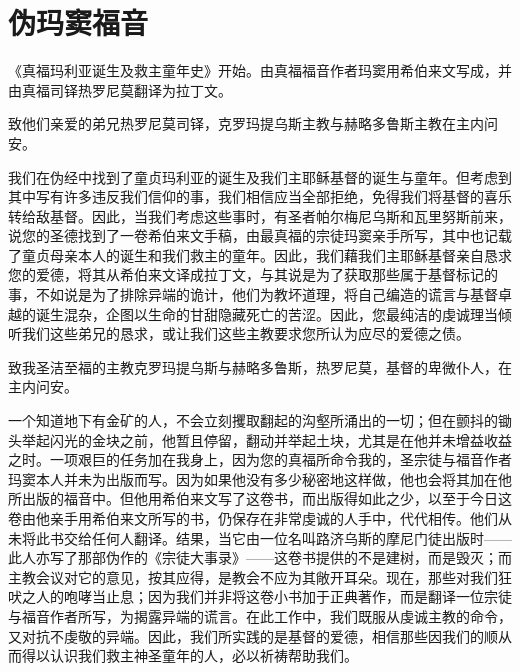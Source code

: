 
\chapter{伪玛窦福音}


《真福玛利亚诞生及救主童年史》开始。由真福福音作者玛窦用希伯来文写成，并由真福司铎热罗尼莫翻译为拉丁文。\par

致他们亲爱的弟兄热罗尼莫司铎，克罗玛提乌斯主教与赫略多鲁斯主教在主内问安。\par

我们在伪经中找到了童贞玛利亚的诞生及我们主耶稣基督的诞生与童年。但考虑到其中写有许多违反我们信仰的事，我们相信应当全部拒绝，免得我们将基督的喜乐转给敌基督。因此，当我们考虑这些事时，有圣者帕尔梅尼乌斯和瓦里努斯前来，说您的圣德找到了一卷希伯来文手稿，由最真福的宗徒玛窦亲手所写，其中也记载了童贞母亲本人的诞生和我们救主的童年。因此，我们藉我们主耶稣基督亲自恳求您的爱德，将其从希伯来文译成拉丁文，与其说是为了获取那些属于基督标记的事，不如说是为了排除异端的诡计，他们为教坏道理，将自己编造的谎言与基督卓越的诞生混杂，企图以生命的甘甜隐藏死亡的苦涩。因此，您最纯洁的虔诚理当倾听我们这些弟兄的恳求，或让我们这些主教要求您所认为应尽的爱德之债。\par

\par

致我圣洁至福的主教克罗玛提乌斯与赫略多鲁斯，热罗尼莫，基督的卑微仆人，在主内问安。\par

一个知道地下有金矿的人，不会立刻攫取翻起的沟壑所涌出的一切；但在颤抖的锄头举起闪光的金块之前，他暂且停留，翻动并举起土块，尤其是在他并未增益收益之时。一项艰巨的任务加在我身上，因为您的真福所命令我的，圣宗徒与福音作者玛窦本人并未为出版而写。因为如果他没有多少秘密地这样做，他也会将其加在他所出版的福音中。但他用希伯来文写了这卷书，而出版得如此之少，以至于今日这卷由他亲手用希伯来文所写的书，仍保存在非常虔诚的人手中，代代相传。他们从未将此书交给任何人翻译。结果，当它由一位名叫路济乌斯的摩尼门徒出版时——此人亦写了那部伪作的《宗徒大事录》——这卷书提供的不是建树，而是毁灭；而主教会议对它的意见，按其应得，是教会不应为其敞开耳朵。现在，那些对我们狂吠之人的咆哮当止息；因为我们并非将这卷小书加于正典著作，而是翻译一位宗徒与福音作者所写，为揭露异端的谎言。在此工作中，我们既服从虔诚主教的命令，又对抗不虔敬的异端。因此，我们所实践的是基督的爱德，相信那些因我们的顺从而得以认识我们救主神圣童年的人，必以祈祷帮助我们。\par

